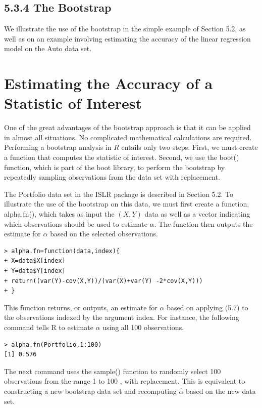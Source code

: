 \documentclass[10pt]{article}
\begin{document}
\subsection*{5.3.4 The Bootstrap}
We illustrate the use of the bootstrap in the simple example of Section 5.2, as well as on an example involving estimating the accuracy of the linear regression model on the Auto data set.

\section*{Estimating the Accuracy of a Statistic of Interest}
One of the great advantages of the bootstrap approach is that it can be applied in almost all situations. No complicated mathematical calculations are required. Performing a bootstrap analysis in $R$ entails only two steps. First, we must create a function that computes the statistic of interest. Second, we use the boot() function, which is part of the boot library, to perform the bootstrap by repeatedly sampling observations from the data set with replacement.

The Portfolio data set in the ISLR package is described in Section 5.2. To illustrate the use of the bootstrap on this data, we must first create a function, alpha.fn(), which takes as input the $(X, Y)$ data as well as a vector indicating which observations should be used to estimate $\alpha$. The function then outputs the estimate for $\alpha$ based on the selected observations.

\begin{verbatim}
> alpha.fn=function(data,index){
+ X=data$X[index]
+ Y=data$Y[index]
+ return((var(Y)-cov(X,Y))/(var(X)+var(Y) -2*cov(X,Y)))
+ }
\end{verbatim}

This function returns, or outputs, an estimate for $\alpha$ based on applying (5.7) to the observations indexed by the argument index. For instance, the following command tells R to estimate $\alpha$ using all 100 observations.

\begin{verbatim}
> alpha.fn(Portfolio,1:100)
[1] 0.576
\end{verbatim}

The next command uses the sample() function to randomly select 100 observations from the range 1 to 100 , with replacement. This is equivalent to constructing a new bootstrap data set and recomputing $\hat{\alpha}$ based on the new data set.
\end{document}
